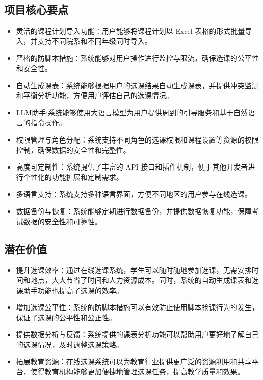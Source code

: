 \documentclass{article}
\begin{document}
\subsection{项目核心要点}
\begin{itemize}
	\item 灵活的课程计划导入功能：用户能够将课程计划以 Excel 表格的形式批量导入，并支持不同院系和不同年级同时导入。
	\item 严格的防脚本措施：系统能够对用户操作进行监控与限流，确保选课的公平性和安全性。
	\item 自动生成课表：系统能够根据用户的选课结果自动生成课表，并提供冲突监测和平衡分析功能，方便用户评估自己的选课情况。
	\item LLM助手:系统能够使用大语言模型为用户提供周到的引导服务和基于自然语言的指令操作。
	\item 权限管理与角色分配：系统支持不同角色的选课权限和课程设置等资源的权限控制，确保数据的安全性和完整性。
	\item 高度可定制性：系统提供了丰富的 API 接口和插件机制，便于其他开发者进行个性化的功能扩展和定制需求。
	\item 多语言支持：系统支持多种语言界面，方便不同地区的用户参与在线选课。
	\item 数据备份与恢复：系统能够定期进行数据备份，并提供数据恢复功能，保障考试数据的安全性和可靠性。
\end{itemize}

\subsection{潜在价值}
\begin{itemize}
	\item 提升选课效率：通过在线选课系统，学生可以随时随地参加选课，无需安排时间和地点，大大节省了时间和人力资源成本。同时，系统的自动生成课表和选课助手功能也提高了选课的效率。
	\item 增加选课公平性：系统的防脚本措施可以有效防止使用脚本抢课行为的发生，保证了选课的公平性和公正性。
	\item 提供数据分析与反馈：系统提供的课表分析功能可以帮助用户更好地了解自己的选课情况，及时调整选课策略。
	\item 拓展教育资源：在线选课系统可以为教育行业提供更广泛的资源利用和共享平台，使得教育机构能够更加便捷地管理选课任务，提高教学质量和效果。
\end{itemize}
\end{document}
